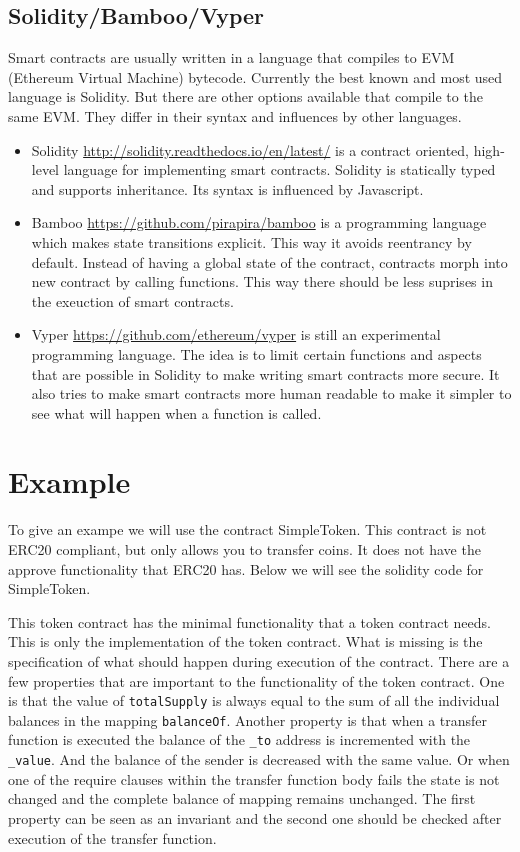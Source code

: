 \documentclass[a4paper]{article}
\begin{document}
\subsection{Solidity/Bamboo/Vyper}
Smart contracts are usually written in a language that compiles to EVM (Ethereum Virtual Machine) bytecode. Currently the best known and most used language is Solidity. But there are other options available that compile to the same EVM. They differ in their syntax and influences by other languages.  
\begin{itemize}
\item Solidity \url{http://solidity.readthedocs.io/en/latest/} is a contract oriented, high-level language for implementing smart contracts. Solidity is statically typed and supports inheritance. Its syntax is influenced by Javascript.
\item Bamboo \url{https://github.com/pirapira/bamboo} is a programming language which makes state transitions explicit. This way it avoids reentrancy by default. Instead of having a global state of the contract, contracts morph into new contract by calling functions. This way there should be less suprises in the exeuction of smart contracts.
\item Vyper \url{https://github.com/ethereum/vyper} is still an experimental programming language. The idea is to limit certain functions and aspects that are possible in Solidity to make writing smart contracts more secure. It also tries to make smart contracts more human readable to make it simpler to see what will happen when a function is called. 
\end{itemize}


\section{Example}
To give an exampe we will use the contract SimpleToken. This contract is not ERC20 compliant, but only allows you to transfer coins. It does not have the approve functionality that ERC20 has. Below we will see the solidity code for SimpleToken.



This token contract has the minimal functionality that a token contract needs. This is only the implementation of the token contract. What is missing is the specification of what should happen during execution of the contract. There are a few properties that are important to the functionality of the token contract. One is that the value of \texttt{totalSupply} is always equal to the sum of all the individual balances in the mapping \texttt{balanceOf}. Another property is that when a transfer function is executed the balance of the \texttt{\_to} address is incremented with the \texttt{\_value}. And the balance of the sender is decreased with the same value. Or when one of the require clauses within the transfer function body  fails the state is not changed and the complete balance of mapping remains unchanged. The first property can be seen as an invariant and the second one should be checked after execution of the transfer function.
\end{document}

